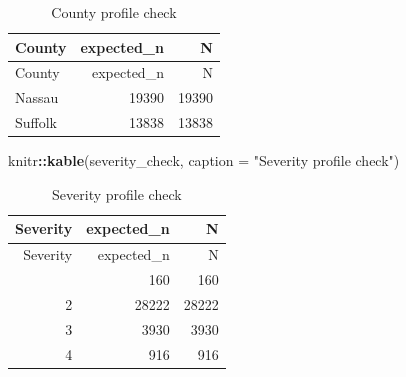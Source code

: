 \documentclass[
]{article}
\newenvironment{Shaded}{\begin{snugshade}}{\end{snugshade}}
\newcommand{\AttributeTok}[1]{\textcolor[rgb]{0.13,0.29,0.53}{#1}}
\newcommand{\ControlFlowTok}[1]{\textcolor[rgb]{0.13,0.29,0.53}{\textbf{#1}}}
\newcommand{\FunctionTok}[1]{\textcolor[rgb]{0.13,0.29,0.53}{\textbf{#1}}}
\newcommand{\NormalTok}[1]{#1}
\newcommand{\SpecialCharTok}[1]{\textcolor[rgb]{0.81,0.36,0.00}{\textbf{#1}}}
\newcommand{\StringTok}[1]{\textcolor[rgb]{0.31,0.60,0.02}{#1}}
\begin{document}
\begin{Shaded}
\end{Shaded}

\begin{longtable}[]{@{}lrr@{}}
\caption{County profile check}\tabularnewline
\toprule\noalign{}
County & expected\_n & N \\
\midrule\noalign{}
\endfirsthead
\toprule\noalign{}
County & expected\_n & N \\
\midrule\noalign{}
\endhead
\bottomrule\noalign{}
\endlastfoot
Nassau & 19390 & 19390 \\
Suffolk & 13838 & 13838 \\
\end{longtable}

\begin{Shaded}
\begin{Highlighting}[]
\NormalTok{knitr}\SpecialCharTok{::}\FunctionTok{kable}\NormalTok{(severity\_check, }\AttributeTok{caption =} \StringTok{"Severity profile check"}\NormalTok{)}
\end{Highlighting}
\end{Shaded}

\begin{longtable}[]{@{}rrr@{}}
\caption{Severity profile check}\tabularnewline
\toprule\noalign{}
Severity & expected\_n & N \\
\midrule\noalign{}
\endfirsthead
\toprule\noalign{}
Severity & expected\_n & N \\
\midrule\noalign{}
\endhead
\bottomrule\noalign{}
\endlastfoot
1 & 160 & 160 \\
2 & 28222 & 28222 \\
3 & 3930 & 3930 \\
4 & 916 & 916 \\
\end{longtable}
\end{document}

